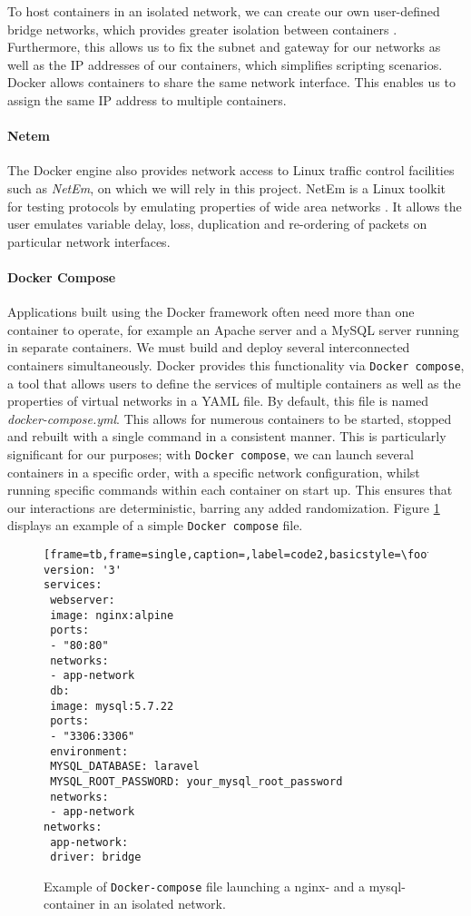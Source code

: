 To host containers in an isolated network, we can create our own user-defined bridge networks, which provides greater isolation between containers \cite{docker_docs}. Furthermore, this allows us to fix the subnet and gateway for our networks as well as the IP addresses of our containers, which simplifies scripting scenarios. Docker allows containers to share the same network interface. This enables us to assign the same IP address to multiple containers.%

\paragraph*{Netem} 
The Docker engine also provides network access to Linux traffic control facilities such as \emph{NetEm}, on which we will rely in this project. NetEm is a Linux toolkit for testing protocols by emulating properties of wide area networks \cite{hemminger2005network}. It allows the user emulates variable delay, loss, duplication and re-ordering of packets on particular network interfaces.




\paragraph*{Docker Compose}
Applications built using the Docker framework often need more than one container to operate, for example an Apache server and a MySQL server running in separate containers. We must build and deploy several interconnected containers simultaneously. Docker provides this functionality via \texttt{Docker compose}, a tool that allows users to define the services of multiple containers as well as the properties of virtual networks in a YAML file. By default, this file is named \textit{docker-compose.yml}. This allows for numerous containers to be started, stopped and rebuilt with a single command in a consistent manner. This is particularly significant for our purposes; with \texttt{Docker compose}, we can launch several containers in a specific order, with a specific network configuration, whilst running specific commands within each container on start up. This ensures that our interactions are deterministic, barring any added randomization. Figure \ref{fig:dockercompose} displays an example of a simple \texttt{Docker compose} file.

\begin{figure}
\begin{lstlisting}[frame=tb,frame=single,caption=,label=code2,basicstyle=\footnotesize]
version: '3'
services:
 webserver:
 image: nginx:alpine
 ports:
 - "80:80"
 networks:
 - app-network
 db:
 image: mysql:5.7.22
 ports:
 - "3306:3306"
 environment:
 MYSQL_DATABASE: laravel
 MYSQL_ROOT_PASSWORD: your_mysql_root_password
 networks:
 - app-network
networks:
 app-network:
 driver: bridge
\end{lstlisting}
\caption{Example of \texttt{Docker-compose} file launching a nginx- and a mysql-container in an isolated network.}
\label{fig:dockercompose}
\end{figure}{}


